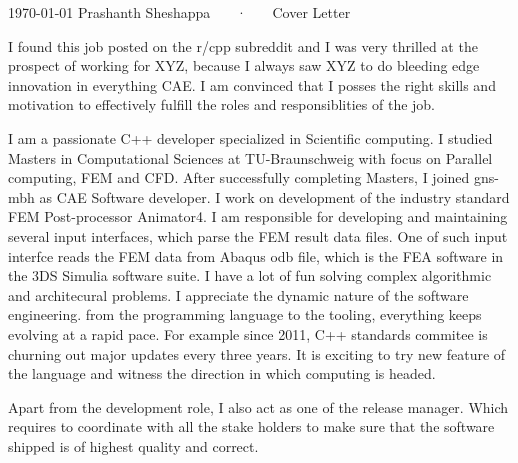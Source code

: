\documentclass[11pt, a4paper]{awesome-cv}
\begin{document}
\makecvheader[R]

\makecvfooter
  {\today}
  {Prashanth Sheshappa ~~~·~~~ Cover Letter}
  {}

\makelettertitle

\begin{cvletter}


I found this job posted on the r/cpp subreddit and I was very thrilled at the prospect of working for XYZ, because I always saw XYZ to do bleeding edge innovation in everything CAE. 
I am convinced that I posses the right skills and motivation to effectively fulfill the roles and responsiblities of the job.

I am a passionate C++ developer specialized in Scientific computing. 
I studied Masters in Computational Sciences at TU-Braunschweig with focus on Parallel computing, FEM and CFD.
After successfully completing Masters, I joined gns-mbh as CAE Software developer. I work on development of the industry standard FEM Post-processor Animator4. 
I am responsible for developing and maintaining several input interfaces, which parse the FEM result data files. 
One of such input interfce reads the FEM data from Abaqus odb file, which is the FEA software in the 3DS Simulia software suite. 
I have a lot of fun solving complex algorithmic and architecural problems. I appreciate the dynamic nature of the software engineering. from the programming language to the tooling, everything keeps evolving at a rapid pace. For example since 2011, C++ standards commitee is churning out major updates every three years. It is exciting to try new feature of the language and witness the direction in which computing is headed.


Apart from the development role, I also act as one of the release manager. Which requires to coordinate with all the stake holders to make sure that the software shipped is of highest quality and correct.


\end{cvletter}
\end{document}
